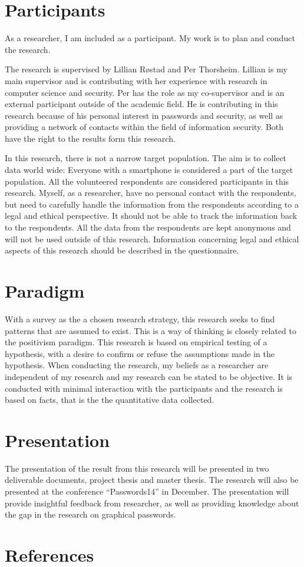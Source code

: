   \section*{Participants}

  As a researcher, I am included as a participant. My work is to plan and conduct the research. 

  The research is supervised by Lillian Røstad and Per Thorsheim. Lillian is my main supervisor and is contributing with her experience with research in computer science and security. Per has the role as my co-supervisor and is an external participant outside of the academic field. He is contributing in this research because of his personal interest in passwords and security, as well as providing a network of contacts within the field of information security. Both have the right to the results form this research.

  In this research, there is not a narrow target population. The aim is to collect data world wide: Everyone with a smartphone is considered a part of the target population. All the volunteered respondents are considered participants in this research. Myself, as a researcher, have no personal contact with the respondents, but need to carefully handle the information from the respondents according to a legal and ethical perspective. It should not be able to track the information back to the respondents. All the data from the respondents are kept anonymous and will not be used outside of this research. Information concerning legal and ethical aspects of this research should be described in the questionnaire. 

  \section*{Paradigm}
  With a survey as the a chosen research strategy, this research seeks to find patterns that are assumed to exist. This is a way of thinking is closely related to the positivism paradigm. This research is based on empirical testing of a hypothesis, with a desire to confirm or refuse the assumptions made in the hypothesis.
  When conducting the research, my beliefs as a researcher are independent of my research and my research can be stated to be objective. It is conducted with minimal interaction with the participants and the research is based on facts, that is the the quantitative data collected. 

  \section*{Presentation}
  The presentation of the result from this research will be presented in two deliverable documents, project thesis and master thesis. The research will also be presented at the conference ``Passwords14''\cite{passwords} in December. The presentation will provide insightful feedback from researcher, as well as providing knowledge about the gap in the research on graphical passwords. 



  \section*{References}
  \renewcommand{\bibsection}{ }
  
  







  